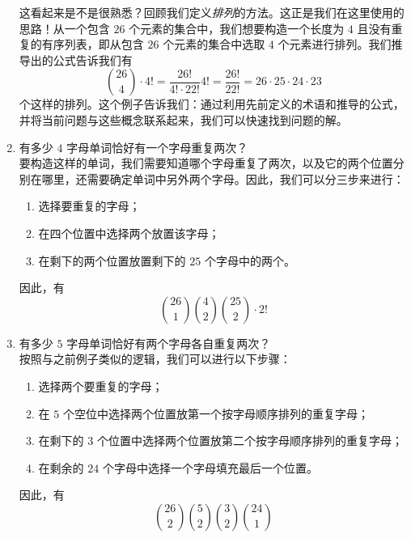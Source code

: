 \begin{example}
\begin{enumerate}
              这看起来是不是很熟悉？回顾我们定义\emph{排列}的方法。这正是我们在这里使用的思路！从一个包含 $26$ 个元素的集合中，我们想要构造一个长度为 $4$ 且没有重复的有序列表，即从包含 $26$ 个元素的集合中选取 $4$ 个元素进行排列。我们推导出的公式告诉我们有
              \[{ 26 \choose 4 } \cdot 4! = \frac{26!}{4! \cdot 22!} 4! = \frac{26!}{22!} = 26 \cdot 25 \cdot 24 \cdot 23\]
              个这样的排列。这个例子告诉我们：通过利用先前定义的术语和推导的公式，并将当前问题与这些概念联系起来，我们可以快速找到问题的解。
        \item 有多少 $4$ 字母单词恰好有一个字母重复两次？\\
              要构造这样的单词，我们需要知道哪个字母重复了两次，以及它的两个位置分别在哪里，还需要确定单词中另外两个字母。因此，我们可以分三步来进行：
              \begin{enumerate}[label=(\arabic*)]
                  \item 选择要重复的字母；
                  \item 在四个位置中选择两个放置该字母；
                  \item 在剩下的两个位置放置剩下的 $25$ 个字母中的两个。
              \end{enumerate}
              因此，有
              \[{ 26 \choose 1 }{ 4 \choose 2 }{ 25 \choose 2 } \cdot 2!\]
        \item 有多少 $5$ 字母单词恰好有两个字母各自重复两次？\\
              按照与之前例子类似的逻辑，我们可以进行以下步骤：
              \begin{enumerate}[label=(\arabic*)]
                  \item 选择两个要重复的字母；
                  \item 在 $5$ 个空位中选择两个位置放第一个按字母顺序排列的重复字母；
                  \item 在剩下的 $3$ 个位置中选择两个位置放第二个按字母顺序排列的重复字母；
                  \item 在剩余的 $24$ 个字母中选择一个字母填充最后一个位置。
              \end{enumerate}
              因此，有
              \[{ 26 \choose 2 }{ 5 \choose 2 }{ 3 \choose 2 }{ 24 \choose 1 }\]
    \end{enumerate}
\end{example}

